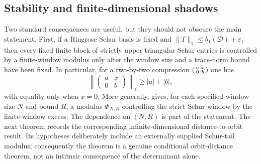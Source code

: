 \subsection{Stability and finite-dimensional shadows}

Two standard consequences are useful, but they should not obscure the main
statement.  First, if a Ringrose Schur basis is fixed and
\(\|T\|_1\le b_1(\mathcal D)+\varepsilon\), then every fixed finite block of
strictly upper triangular Schur entries is controlled by a finite-window
modulus only after the window size and a trace-norm bound have been fixed.  In
particular, for a two-by-two compression
\(
  \begin{psmallmatrix}a&x\\0&b\end{psmallmatrix}
\)
one has
\[
  \left\|\begin{pmatrix}a&x\\0&b\end{pmatrix}\right\|_1
  \ge |a|+|b|,
\]
with equality only when \(x=0\).  More generally,
 gives, for each specified
window size \(N\) and bound \(R\), a modulus \(\Phi_{N,R}\) controlling the
strict Schur window by the finite-window excess.  The dependence on
\((N,R)\) is part of the statement.  The next theorem records the corresponding
infinite-dimensional distance-to-orbit result.  Its hypotheses deliberately
include an externally supplied Schur-tail modulus; consequently the theorem is
a genuine conditional orbit-distance theorem, not an intrinsic consequence of
the determinant alone.

